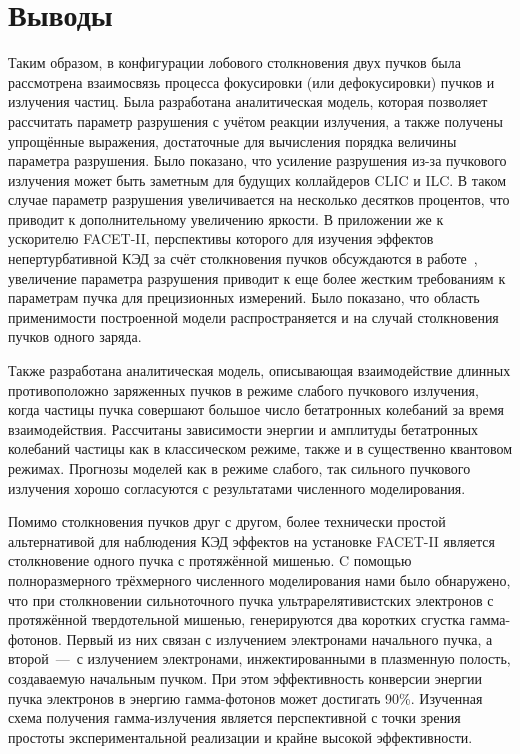 \section{Выводы}

Таким образом, в конфигурации лобового столкновения двух пучков была рассмотрена взаимосвязь процесса фокусировки (или дефокусировки) пучков и излучения частиц.
Была разработана аналитическая модель, которая позволяет рассчитать параметр разрушения с учётом реакции излучения, а также получены упрощённые выражения, достаточные для вычисления порядка величины параметра разрушения.
Было показано, что усиление разрушения из-за пучкового излучения может быть заметным для будущих коллайдеров CLIC и ILC.
В таком случае параметр разрушения увеличивается на несколько десятков процентов, что приводит к дополнительному увеличению яркости.
В приложении же к ускорителю FACET-II, перспективы которого для изучения эффектов непертурбативной КЭД за счёт столкновения пучков обсуждаются в работе~\cite{yakimenko2019prospect}, увеличение параметра разрушения приводит к еще более жестким требованиям к параметрам пучка для прецизионных измерений.
Было показано, что область применимости построенной модели распространяется и на случай столкновения пучков одного заряда.

Также разработана аналитическая модель, описывающая взаимодействие длинных противоположно заряженных пучков в режиме слабого пучкового излучения, когда частицы пучка совершают большое число бетатронных колебаний за время взаимодействия.
Рассчитаны зависимости энергии и амплитуды бетатронных колебаний частицы как в классическом режиме, также и в существенно квантовом режимах.
Прогнозы моделей как в режиме слабого, так сильного пучкового излучения хорошо согласуются с результатами численного моделирования.

Помимо столкновения пучков друг с другом, более технически простой альтернативой для наблюдения КЭД эффектов на установке FACET-II является столкновение одного пучка с протяжённой мишенью.
C помощью полноразмерного трёхмерного численного моделирования нами было обнаружено, что при столкновении сильноточного пучка ультрарелятивистских электронов с протяжённой твердотельной мишенью, генерируются два коротких сгустка гамма-фотонов.
Первый из них связан с излучением электронами начального пучка, а второй~---~с излучением электронами, инжектированными в плазменную полость, создаваемую начальным пучком.
При этом эффективность конверсии энергии пучка электронов в энергию гамма-фотонов может достигать 90\%.
Изученная схема получения гамма-излучения является перспективной с точки зрения простоты экспериментальной реализации и крайне высокой эффективности.

